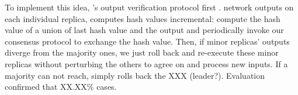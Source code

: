 


To implement this idea, \xxx's output verification protocol first . network 
outputs on each individual replica, computes  hash values incremental:
compute the hash value of a union of last hash value and the output  and 
periodically invoke our \paxos consensus protocol to exchange the hash value. 
Then, if minor replicas' outputs diverge from the majority ones, we just roll 
back and re-execute these minor replicas without perturbing the others to agree 
on and process new inputs. If a majority can not reach, \xxx simply rolls back 
the XXX (leader?). Evaluation confirmed that XX.XX\% cases.



